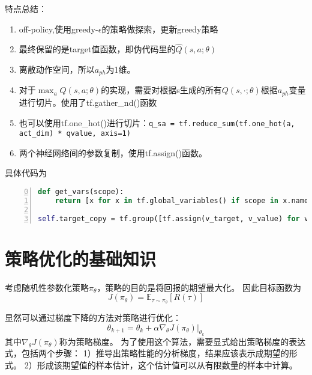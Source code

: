 特点总结：
\begin{enumerate}
    \item off-policy,使用greedy-$\epsilon$的策略做探索，更新greedy策略
    \item 最终保留的是target值函数，即伪代码里的$\hat{Q}(s,a;\theta)$
    \item 离散动作空间，所以$a_{ph}$为1维。
    \item 对于$\max_a Q(s,a;\theta)$的实现，需要对根据s生成的所有$Q(s,\cdot;\theta)$根据$a_{ph}$变量进行切片。使用了tf.gather\_nd()函数
    \item 也可以使用tf.one_hot()进行切片：\texttt{q_sa = tf.reduce_sum(tf.one_hot(a, act_dim) * qvalue, axis=1)}
    \item 两个神经网络间的参数复制，使用tf.assign()函数。
\end{enumerate}

具体代码为
\begin{lstlisting}[language=python,numbers=left,firstnumber = 0,numberstyle=\tiny,breaklines = true,keywordstyle=\color{blue!70},commentstyle=\color{red!50!green!50!blue!50},frame=shadowbox, rulesepcolor=\color{red!20!green!20!blue!20}]
def get_vars(scope):
    return [x for x in tf.global_variables() if scope in x.name]}

self.target_copy = tf.group([tf.assign(v_target, v_value) for v_value, v_target in zip(get_vars('value'), get_vars('target'))])
\end{lstlisting}






\section{策略优化的基础知识}{\label{sec: policy}}
考虑随机性参数化策略$\pi_\theta$，策略的目的是将回报的期望最大化。
因此目标函数为
\begin{equation*}
    J(\pi_\theta) = \mathbb{E}_{\tau\sim\pi_\theta}[R(\tau)]
\end{equation*}

显然可以通过梯度下降的方法对策略进行优化：
\begin{equation*}
    \theta_{k+1} = \theta_k + \alpha \nabla_\theta J(\pi_\theta)|_{\theta_k}
\end{equation*}
其中$\nabla_\theta J(\pi_\theta)$称为策略梯度。
为了使用这个算法，需要显式给出策略梯度的表达式，包括两个步骤：
1）推导出策略性能的分析梯度，结果应该表示成期望的形式。
2）形成该期望值的样本估计，这个估计值可以从有限数量的样本中计算。

